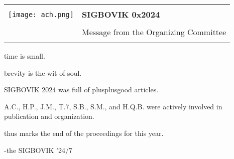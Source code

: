\documentclass[12pt]{article}
\begin{document}
{\sffamily
\begin{tabular}{ll}
\multirow{3}{*}{\texttt{[image: ach.png]}}\\
& \textbf{\Huge{SIGBOVIK 0x2024}} \\ &\\
& \LARGE{Message from the Organizing Committee} \\
&\\
\hline
\end{tabular}}
\vfill
\thispagestyle{empty}

%





time is small. 

brevity is the wit of soul.

SIGBOVIK 2024 was full of plusplusgood articles.

A.C., H.P., J.M., T.7, S.B., S.M., and H.Q.B. were actively involved in publication and organization.

thus marks the end of the proceedings for this year.

-the SIGBOVIK '24/7\\

\vfill

%
%
\thispagestyle{empty}
\end{document}
